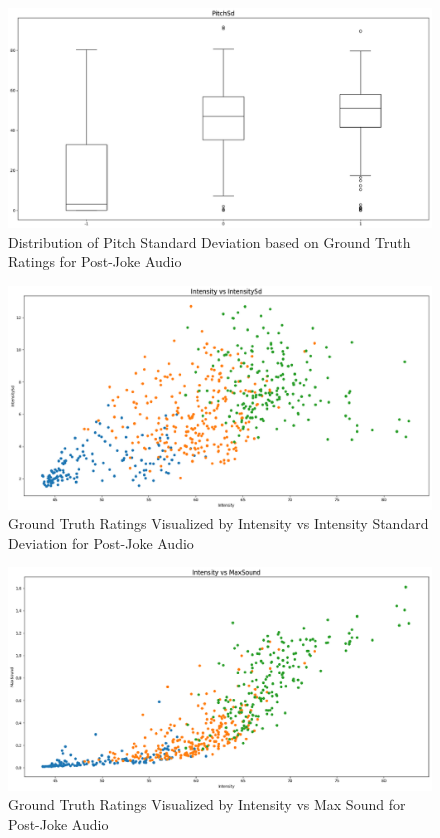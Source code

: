\documentclass[onecolumn, draftclsnofoot,10pt, compsoc]{IEEEtran}
\begin{document}
\begin{figure}[!h]
\includegraphics[width=\linewidth]{assets/fig6.eps}
\caption{Distribution of Pitch Standard Deviation based on Ground Truth Ratings for Post-Joke Audio}
\end{figure}

\begin{figure}[!h]
\includegraphics[width=\linewidth]{assets/fig7.eps}
\caption{Ground Truth Ratings Visualized by Intensity vs Intensity Standard Deviation for Post-Joke Audio}
\end{figure}

\begin{figure}[!h]
\includegraphics[width=\linewidth]{assets/fig8.eps}
\caption{Ground Truth Ratings Visualized by Intensity vs Max Sound for Post-Joke Audio}
\end{figure}
\end{document}
